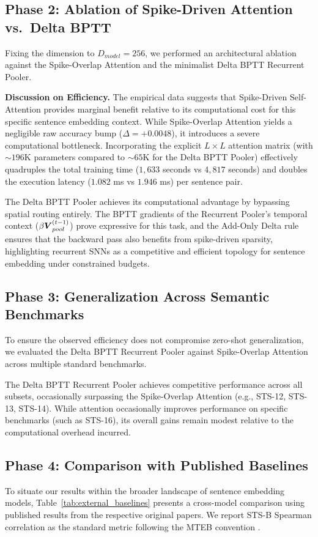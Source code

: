 \documentclass[10pt,a4paper,twoside]{article}
\begin{document}
\subsection{Phase 2: Ablation of Spike-Driven Attention vs.\ Delta BPTT}
Fixing the dimension to $D_{model} = 256$, we performed an architectural ablation against the Spike-Overlap Attention and the minimalist Delta BPTT Recurrent Pooler.

\textbf{Discussion on Efficiency.} The empirical data suggests that Spike-Driven Self-Attention provides marginal benefit relative to its computational cost for this specific sentence embedding context. While Spike-Overlap Attention yields a negligible raw accuracy bump ($\Delta = +0.0048$), it introduces a severe computational bottleneck. Incorporating the explicit $L \times L$ attention matrix (with $\sim 196$K parameters compared to $\sim 65$K for the Delta BPTT Pooler) effectively quadruples the total training time ($1{,}633$ seconds vs $4{,}817$ seconds) and doubles the execution latency ($1.082$ ms vs $1.946$ ms) per sentence pair.

The Delta BPTT Pooler achieves its computational advantage by bypassing spatial routing entirely. The BPTT gradients of the Recurrent Pooler's temporal context ($\beta \boldsymbol{V}_{pool}^{(t-1)}$) prove expressive for this task, and the Add-Only Delta rule ensures that the backward pass also benefits from spike-driven sparsity, highlighting recurrent SNNs as a competitive and efficient topology for sentence embedding under constrained budgets.

\subsection{Phase 3: Generalization Across Semantic Benchmarks}
To ensure the observed efficiency does not compromise zero-shot generalization, we evaluated the Delta BPTT Recurrent Pooler against Spike-Overlap Attention across multiple standard benchmarks.

The Delta BPTT Recurrent Pooler achieves competitive performance across all subsets, occasionally surpassing the Spike-Overlap Attention (e.g., STS-12, STS-13, STS-14). While attention occasionally improves performance on specific benchmarks (such as STS-16), its overall gains remain modest relative to the computational overhead incurred.

\subsection{Phase 4: Comparison with Published Baselines}
To situate our results within the broader landscape of sentence embedding models, Table~\ref{tab:external_baselines} presents a cross-model comparison using published results from the respective original papers. We report STS-B Spearman correlation as the standard metric following the MTEB convention \cite{muennighoff2022mteb}.
\end{document}
